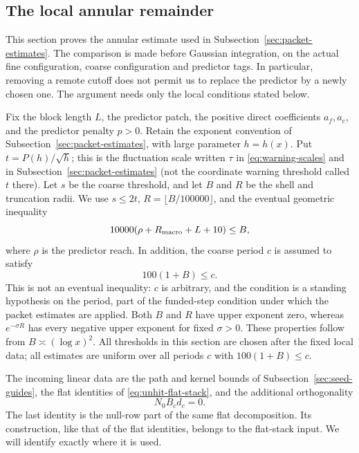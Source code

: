 \subsection{The local annular remainder}
\label{sec:packet-annulus}
This section proves the annular estimate used in
Subsection~\ref{sec:packet-estimates}. The comparison is made before
Gaussian integration, on the actual fine configuration, coarse
configuration and predictor tags. In particular, removing a remote
cutoff does not permit us to replace the predictor by a newly chosen
one. The argument needs only the local conditions stated below.

Fix the block length $L$, the predictor patch, the positive direct
coefficients $a_f,a_c$, and the predictor penalty $p>0$. Retain the
exponent convention of Subsection~\ref{sec:packet-estimates}, with large
parameter $h=h(x)$. Put $t=P(h)/\sqrt h$; this is the fluctuation
scale written $\tau$ in \eqref{eq:warning-scales} and in
Subsection~\ref{sec:packet-estimates} (not the coordinate warning threshold
called $t$ there). Let $s$ be the coarse
threshold, and let $B$ and $R$ be the shell and truncation radii.
We use $s\le2t$, $R=\lfloor B/100000\rfloor$, and the eventual
geometric inequality
\[
 10000(\rho+R_{\rm macro}+L+10)\le B,
\]
where $\rho$ is the predictor reach. In addition, the coarse period
$c$ is assumed to satisfy
\[
 100(1+B)\le c.
\]
This is not an eventual inequality: $c$ is arbitrary, and the
condition is a standing hypothesis on the period, part of the
funded-step condition under which the packet estimates are applied.
Both $B$ and $R$ have upper exponent zero, whereas
$e^{-\sigma R}$ has every negative upper exponent for fixed
$\sigma>0$. These properties follow from $B\asymp(\log x)^2$.
All thresholds in this section are chosen after the fixed local data;
all estimates are uniform over all periods $c$ with $100(1+B)\le c$.

The incoming linear data are the path and kernel bounds of
Subsection~\ref{sec:seed-guides}, the flat identities of
\eqref{eq:unhit-flat-stack}, and the additional orthogonality
\begin{equation}\label{eq:annulus-null-row}
 N_0B_cd_c=0.
\end{equation}
The last identity is the null-row part of the same flat decomposition.
Its construction, like that of the flat identities, belongs to the
flat-stack input. We will identify exactly where it is used.

